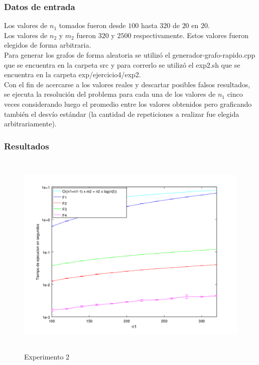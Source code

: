         
        \subsubsection*{Datos de entrada}\;
        
        \noindent Los valores de $n_1$ tomados fueron desde $100$ hasta $320$ de $20$ en $20$. \\
       Los valores de $n_2$ y $m_2$ fueron $320$ y $2500$ respectivamente. Estos valores fueron elegidos de forma arbitraria.\\
        Para generar los grafos de forma aleatoria se utilizó el generador-grafo-rapido.cpp que se encuentra en la carpeta src y para correrlo se utilizó el exp2.sh que se encuentra en la carpeta exp/ejercicio4/exp2. \\
        Con el fin de acercarse a los valores reales y descartar posibles falsos resultados, se ejecuta la resolución del problema para cada una de los valores de $n_1$ cinco veces considerando luego el promedio entre los valores obtenidos pero graficando también el desvío estándar (la cantidad de repeticiones a realizar fue elegida arbitrariamente).\; 
        
         \subsubsection*{Resultados}\;

    \begin{figure}[H]
      \includegraphics[height=10cm]{graficos/ejercicio4-exp2.png}
       \caption{Experimento 2}
	\end{figure}
        
